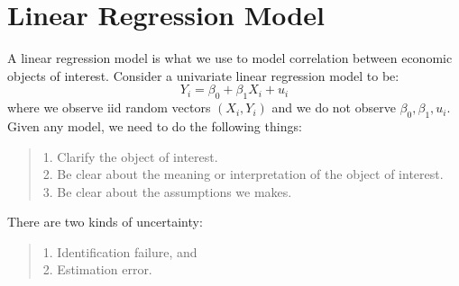 \section{Linear Regression Model}
A linear regression model is what we use to model correlation between economic objects of interest. Consider a univariate linear regression model to be:
$$Y_i = \beta_0 + \beta_1 X_i + u_i$$
where we observe iid random vectors $(X_i, Y_i)$ and we do not observe $\beta_0, \beta_1, u_i$. \\
Given any model, we need to do the following things:
\begin{quote}
    1. Clarify the object of interest. \\
    2. Be clear about the meaning or interpretation of the object of interest. \\
    3. Be clear about the assumptions we makes.
\end{quote}
There are two kinds of uncertainty:
\begin{quote}
    1. Identification failure, and \\
    2. Estimation error.
\end{quote}

